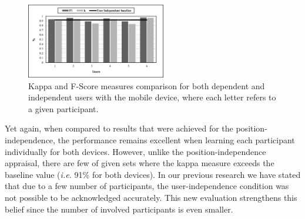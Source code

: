 \documentclass[10pt,conference]{IEEEtran}
\begin{document}
\begin{figure}[!ht]
	\centering
	\includegraphics[width=2.4in]{ui_cell.eps}
	\caption{Kappa and F-Score measures comparison for both dependent and independent users with the mobile device, where each letter refers to a given participant.}
	\label{fig:ui_cell}
\end{figure}

Yet again, when compared to results that were achieved for the position-independence, the performance remains excellent when learning each participant individually for both devices. However, unlike the position-independence appraisal, there are few of given sets where the kappa measure exceeds the baseline value (\textit{i.e.} 91\% for both devices). In our previous research we have stated that due to a few number of participants, the user-independence condition was not possible to be acknowledged accurately. This new evaluation strengthens this belief since the number of involved participants is even smaller.

\end{document}

